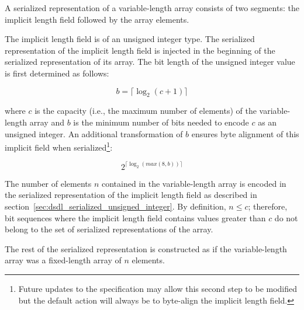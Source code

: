 A serialized representation of a variable-length array consists of two segments:
the implicit length field followed by the array elements.

The implicit length field is of an unsigned integer type.
The serialized representation of the implicit length field
is injected in the beginning of the serialized representation of its array.
The bit length of the unsigned integer value is first determined as follows:

$$b=\lceil{}\log_2 (c + 1)\rceil{}$$

where $c$ is the capacity (i.e., the maximum number of elements) of the variable-length array and
$b$ is the minimum number of bits needed to encode $c$ as an unsigned integer. An additional transformation
of $b$ ensures byte alignment of this implicit field when serialized\footnote{Future updates to the specification
may allow this second step to be modified but the default action will always be to byte-align the implicit
length field.}:

$$2^{\lceil{}\log_2 (max(8, b))\rceil{}}$$

The number of elements $n$ contained in the variable-length array is encoded
in the serialized representation of the implicit length field
as described in section~\ref{sec:dsdl_serialized_unsigned_integer}.
By definition, $n \leq c$; therefore, bit sequences where the implicit length field contains values
greater than $c$ do not belong to the set of serialized representations of the array.

The rest of the serialized representation is constructed as if the variable-length array was
a fixed-length array of $n$ elements.

